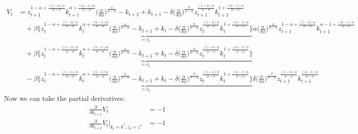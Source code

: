 \documentclass[a4paper]{article}
\theoremstyle{definition}
\begin{document}
	\begin{align*}
	V_t 	&= z_{t+1}^{1-\alpha+\frac{(1-\alpha)\alpha}{\phi-\alpha}} k_{t+1}^{\alpha+\frac{(\alpha-1)\alpha}{\phi-\alpha}} \Big( \frac{\alpha}{\delta\phi} \Big)^{\frac{\alpha}{\phi-\alpha}}-k_{t+2} + k_{t+1} - \delta \Big( \frac{\alpha}{\delta\phi} \Big)^{\frac{\phi}{\phi-\alpha}}z_{t+1}^{\frac{(1-\alpha)\phi}{\phi-\alpha}}k_{t+1}^{1+\frac{(\alpha-1)\phi}{\phi-\alpha}} \\
			&\quad + \beta \underbrace{\Big\{ z_{t}^{1-\alpha+\frac{(1-\alpha)\alpha}{\phi-\alpha}} k_{t}^{\alpha+\frac{(\alpha-1)\alpha}{\phi-\alpha}} \Big( \frac{\alpha}{\delta\phi} \Big)^{\frac{\alpha}{\phi-\alpha}}-k_{t+1} + k_{t} - \delta \Big( \frac{\alpha}{\delta\phi} \Big)^{\frac{\phi}{\phi-\alpha}}z_{t}^{\frac{(1-\alpha)\phi}{\phi-\alpha}}k_{t}^{1+\frac{(\alpha-1)\phi}{\phi-\alpha}} \Big\}}_{=c_t} \alpha \Big( \frac{\alpha}{\delta\phi} \Big)^{\frac{\alpha}{\phi-\alpha}} z_{t+1}^{1-\alpha+\frac{(1-\alpha)\alpha}{\phi-\alpha}}k_{t+1}^{\alpha-1+\frac{(\alpha-1)\alpha}{\phi-\alpha}} \\
			&\quad + \beta \underbrace{\Big\{ z_{t}^{1-\alpha+\frac{(1-\alpha)\alpha}{\phi-\alpha}} k_{t}^{\alpha+\frac{(\alpha-1)\alpha}{\phi-\alpha}} \Big( \frac{\alpha}{\delta\phi} \Big)^{\frac{\alpha}{\phi-\alpha}}-k_{t+1} + k_{t} - \delta \Big( \frac{\alpha}{\delta\phi} \Big)^{\frac{\phi}{\phi-\alpha}}z_{t}^{\frac{(1-\alpha)\phi}{\phi-\alpha}}k_{t}^{1+\frac{(\alpha-1)\phi}{\phi-\alpha}} \Big\}}_{=c_t} \\
			&\quad - \beta \underbrace{\Big\{ z_{t}^{1-\alpha+\frac{(1-\alpha)\alpha}{\phi-\alpha}} k_{t}^{\alpha+\frac{(\alpha-1)\alpha}{\phi-\alpha}} \Big( \frac{\alpha}{\delta\phi} \Big)^{\frac{\alpha}{\phi-\alpha}}-k_{t+1} + k_{t} - \delta \Big( \frac{\alpha}{\delta\phi} \Big)^{\frac{\phi}{\phi-\alpha}}z_{t}^{\frac{(1-\alpha)\phi}{\phi-\alpha}}k_{t}^{1+\frac{(\alpha-1)\phi}{\phi-\alpha}} \Big\}}_{=c_t} \delta \Big( \frac{\alpha}{\delta\phi} \Big)^{\frac{\phi}{\phi-\alpha}}z_{t+1}^{\frac{(1-\alpha)\phi}{\phi-\alpha}}k_{t+1}^{\frac{(\alpha-1)\phi}{\phi-\alpha}}
	\end{align*}	
Now we can take the partial derivatives:
	\begin{align*}
	\frac{\partial}{\partial k_{t+2}}V_t 									&= -1  \\
	\frac{\partial}{\partial k_{t+2}}V_t |_{k_{t}=k^*,z_{t}=z^*} 	&= -1 
	\end{align*}	
\end{document}
